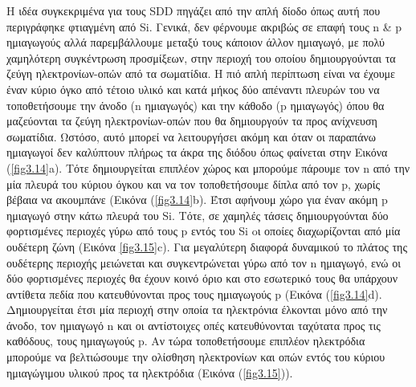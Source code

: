 	Η ιδέα συγκεκριμένα για τους SDD πηγάζει από την απλή δίοδο όπως αυτή που περιγράφηκε φτιαγμένη από Si. 
	Γενικά, δεν φέρνουμε ακριβώς σε επαφή τους n \& p ημιαγωγούς αλλά παρεμβάλλουμε μεταξύ τους κάποιον άλλον ημιαγωγό, με πολύ χαμηλότερη συγκέντρωση προσμίξεων, στην περιοχή του οποίου δημιουργούνται τα ζεύγη ηλεκτρονίων-οπών από τα σωματίδια. 
	Η πιό απλή περίπτωση είναι να έχουμε έναν κύριο όγκο από τέτοιο υλικό και κατά μήκος δύο απέναντι πλευρών του να τοποθετήσουμε την άνοδο (n ημιαγωγός) και την κάθοδο (p ημιαγωγός) όπου θα μαζεύονται τα ζεύγη ηλεκτρονίων-οπών που θα δημιουργούν τα προς ανίχνευση σωματίδια.
	Ωστόσο, αυτό μπορεί να λειτουργήσει ακόμη και όταν οι παραπάνω ημιαγωγοί δεν καλύπτουν πλήρως τα άκρα της διόδου όπως φαίνεται στην Εικόνα (\ref{fig3.14}a).
	Τότε δημιουργείται επιπλέον χώρος και μπορούμε  πάρουμε τον n από την μία πλευρά του κύριου όγκου και να τον τοποθετήσουμε δίπλα από τον p, χωρίς βέβαια να ακουμπάνε (Εικόνα (\ref{fig3.14}b). Έτσι αφήνουμ χώρο για έναν ακόμη p ημιαγωγό στην κάτω πλευρά του Si. 
	Τότε, σε χαμηλές τάσεις δημιουργούνται δύο φορτισμένες περιοχές γύρω από τους p εντός του Si oι οποίες διαχωρίζονται από μία ουδέτερη ζώνη (Εικόνα \ref{fig3.15}c). Για μεγαλύτερη διαφορά δυναμικού το πλάτος της ουδέτερης περιοχής μειώνεται και συγκεντρώνεται γύρω από τον n ημιαγωγό, ενώ οι δύο φορτισμένες περιοχές θα έχουν κοινό όριο και στο εσωτερικό τους θα υπάρχουν αντίθετα πεδία που κατευθύνονται προς τους ημιαγωγούς p (Εικόνα (\ref{fig3.14}d).
	Δημιουργείται έτσι μία περιοχή στην οποία τα ηλεκτρόνια έλκονται μόνο από την άνοδο, τον ημιαγωγό n και οι αντίστοιχες οπές κατευθύνονται ταχύτατα προς τις καθόδους, τους ημιαγωγούς p.
	Αν τώρα τοποθετήσουμε επιπλέον ηλεκτρόδια μπορούμε να βελτιώσουμε την ολίσθηση ηλεκτρονίων και οπών εντός του κύριου ημιαγώγιμου υλικού προς τα ηλεκτρόδια (Εικόνα (\ref{fig3.15})).
